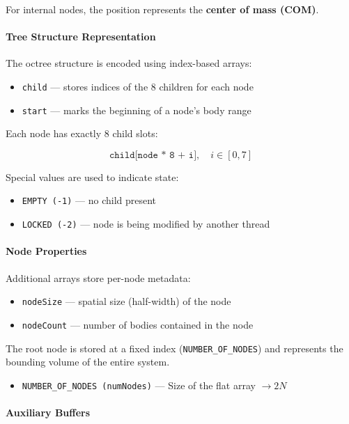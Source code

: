 \documentclass[12pt]{article}
\begin{document}
For internal nodes, the position represents the \textbf{center of mass (COM)}.

\paragraph{Tree Structure Representation}

The octree structure is encoded using index-based arrays:

\begin{itemize}
    \item \texttt{child} — stores indices of the 8 children for each node
    \item \texttt{start} — marks the beginning of a node's body range
\end{itemize}

Each node has exactly 8 child slots:

\[
\texttt{child[node * 8 + i]}, \quad i \in [0,7]
\]

Special values are used to indicate state:

\begin{itemize}
    \item \texttt{EMPTY (-1)} — no child present
    \item \texttt{LOCKED (-2)} — node is being modified by another thread
\end{itemize}

\paragraph{Node Properties}

Additional arrays store per-node metadata:

\begin{itemize}
    \item \texttt{nodeSize} — spatial size (half-width) of the node
    \item \texttt{nodeCount} — number of bodies contained in the node
\end{itemize}

The root node is stored at a fixed index (\texttt{NUMBER\_OF\_NODES}) and represents the bounding volume of the entire system.

\begin{itemize}
    \item \texttt{NUMBER\_OF\_NODES (numNodes)} — Size of the flat array $\rightarrow 2N$
\end{itemize}

\paragraph{Auxiliary Buffers}
\end{document}
